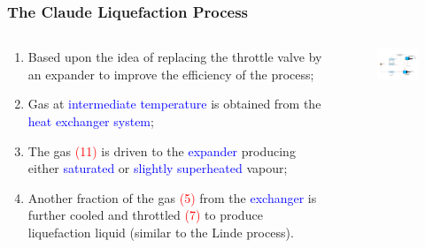 \documentclass[10pt,compress]{beamer}
\begin{document}
\begin{frame}
 \frametitle{The Claude Liquefaction Process}
  \begin{columns}
   \begin{column}[c]{0.45\linewidth}
  \begin{enumerate}[(1)]
   \item <1-> Based upon the idea of replacing the throttle valve by an expander to improve the efficiency of the process;
   \item <2-> Gas at \textcolor{blue}{intermediate temperature} is obtained from the \textcolor{blue}{heat exchanger system}; 
   \item <3-> The gas \textcolor{red}{(11)} is driven to the \textcolor{blue}{expander} producing either \textcolor{blue}{saturated} or \textcolor{blue}{slightly superheated} vapour;
   \item <4-> Another fraction of the gas \textcolor{red}{(5)} from the \textcolor{blue}{exchanger} is further cooled and throttled \textcolor{red}{(7)} to produce liquefaction liquid (similar to the Linde process).
  \end{enumerate}
   \end{column}
   \begin{column}[c]{0.55\linewidth}
    \begin{figure}%
     \begin{center}
      \includegraphics[width=6.5cm,clip]{./Pics/Overview_Refrig40}
     \end{center}
    \end{figure}  
   \end{column}  
  \end{columns}
\end{frame}
\end{document}
